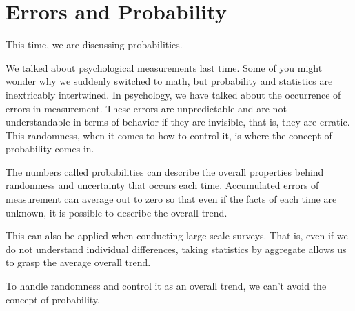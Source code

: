 \documentclass{ltjbook}
\begin{document}
\VerbatimFootnotes
\chapter{Errors and Probability}
\label{m07_probability}
This time, we are discussing probabilities.

We talked about psychological measurements last time. Some of you might wonder why we suddenly switched to math, but probability and statistics are inextricably intertwined.
In psychology, we have talked about the occurrence of errors in measurement. These errors are unpredictable and are not understandable in terms of behavior if they are invisible, that is, they are erratic.
This randomness, when it comes to how to control it, is where the concept of probability comes in.

The numbers called probabilities can describe the overall properties behind randomness and uncertainty that occurs each time.
Accumulated errors of measurement can average out to zero so that even if the facts of each time are unknown, it is possible to describe the overall trend.

This can also be applied when conducting large-scale surveys. That is, even if we do not understand individual differences, taking statistics by aggregate allows us to grasp the average overall trend.

To handle randomness and control it as an overall trend, we can't avoid the concept of probability.
\end{document}
